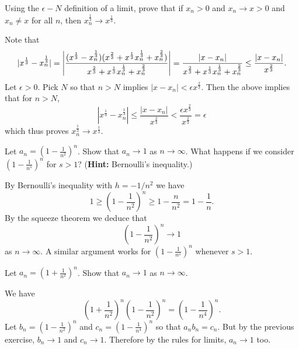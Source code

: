 \documentclass[11pt,dvipsnames]{book}
\numberwithin{figure}{section} %
\numberwithin{table}{section} %
\begin{document}
\begin{exercise} Using the $\epsilon-N$ definition of a limit, prove that if $x_n>0$ and $x_n\rightarrow x>0$ and $x_n\neq x$ for all $n$, then $x_{n}^{\frac{1}{3}}\rightarrow x^{\frac{1}{3}}$.

\begin{solution}
Note that
\[
|x^{\frac{1}{3}}-x_{n}^{\frac{1}{3}}|
=\left| \frac{ (x^{\frac{1}{3}}-x_{n}^{\frac{1}{3}})(x^{\frac{2}{3}}+x^{\frac{1}{3}}x_{n}^{\frac{1}{3}}+x_{n}^{\frac{2}{3}})}{x^{\frac{2}{3}}+x^{\frac{1}{3}}x_{n}^{\frac{1}{3}}+x_{n}^{\frac{2}{3}}} \right|
 = \frac{|x-x_{n}|}{x^{\frac{2}{3}}+x^{\frac{1}{3}}x_{n}^{\frac{1}{3}}+x_{n}^{\frac{2}{3}}}
 \leq \frac{|x-x_{n}|}{x^{\frac{2}{3}}}.\\
\]
Let $\epsilon>0$. Pick $N$ so that $n> N$ implies $|x-x_{n}|< \epsilon x^{\frac{2}{3}}$. Then the above implies that for $n> N$,
\[
|x^{\frac{1}{3}}-x_{n}^{\frac{1}{3}}|
\leq  \frac{|x-x_{n}|}{x^{\frac{2}{3}}}
<\frac{\epsilon x^{\frac{2}{3}}}{x^{\frac{2}{3}}}=\epsilon
\]
which thus proves $x_{n}^{\frac{1}{3}}\rightarrow x^{\frac{1}{3}}$.
\end{solution}

\end{exercise}

\begin{exercise}
Let $a_n = \left( 1- \frac{1}{n^2}\right)^n$. Show that $a_n \to 1$ as $n \to \infty$. What happens if we consider $\left(1-\frac{1}{n^s}\right)^n$ for $s > 1$? ({\bf Hint:} Bernoulli's inequality.)
\begin{solution}
By Bernoulli's inequality with $ h= -1/n^2$ we have
\[1 \geq \left( 1- \frac{1}{n^2}\right)^n \geq 1 - \frac{n}{n^2}
= 1 - \frac{1}{n}.\]
By the squeeze theorem we deduce that
\[ \left( 1- \frac{1}{n^2}\right)^n \to 1\]
as $n \to \infty$. A similar  argument works for $\left(1-\frac{1}{n^s}\right)^n$
whenever $s > 1$.
\end{solution}
\end{exercise}

\begin{exercise}
Let $a_n = \left( 1+ \frac{1}{n^2}\right)^n$. Show that $a_n \to 1$ as $n \to \infty$.
\end{exercise}
\begin{solution}
We have
\[ \left( 1+ \frac{1}{n^2}\right)^n\left( 1- \frac{1}{n^2}\right)^n=\left( 1- \frac{1}{n^4}\right)^n.\]
Let $b_n = \left( 1- \frac{1}{n^2}\right)^n$ and $c_n = \left( 1- \frac{1}{n^4}\right)^n$ so that
$a_n b_n = c_n$. But by the previous exercise, $b_n \to 1$ and $c_n \to 1$. Therefore by the rules for limits, $a_n \to 1$ too.

\end{solution}
\end{document}
